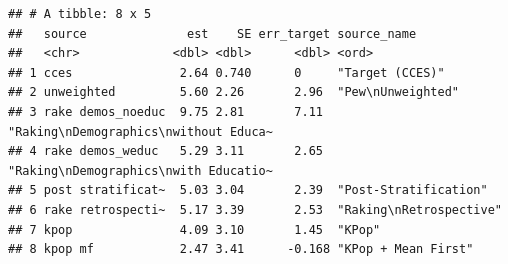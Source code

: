 \documentclass[
]{article}
\begin{document}
\begin{verbatim}
## # A tibble: 8 x 5
##   source              est    SE err_target source_name                          
##   <chr>             <dbl> <dbl>      <dbl> <ord>                                
## 1 cces               2.64 0.740      0     "Target (CCES)"                      
## 2 unweighted         5.60 2.26       2.96  "Pew\nUnweighted"                    
## 3 rake demos_noeduc  9.75 2.81       7.11  "Raking\nDemographics\nwithout Educa~
## 4 rake demos_weduc   5.29 3.11       2.65  "Raking\nDemographics\nwith Educatio~
## 5 post stratificat~  5.03 3.04       2.39  "Post-Stratification"                
## 6 rake retrospecti~  5.17 3.39       2.53  "Raking\nRetrospective"              
## 7 kpop               4.09 3.10       1.45  "KPop"                               
## 8 kpop mf            2.47 3.41      -0.168 "KPop + Mean First"
\end{verbatim}
\end{document}

